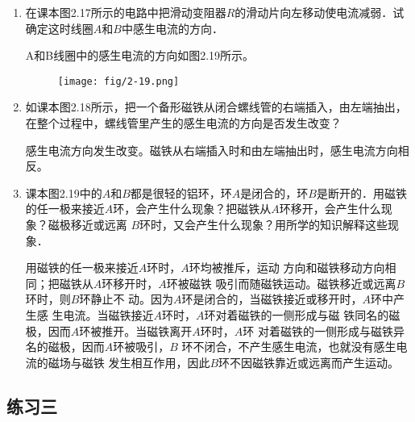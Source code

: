 \begin{enumerate}
  \item 在课本图2.17所示的电路中把滑动变阻器$R$的滑动片向左移动使电流减弱．试确定这时线圈$A$和$B$中感生电流的方向．

  \begin{solution}
    A和B线圈中的感生电流的方向如图2.19所示。
\begin{figure}[htp]\centering
\texttt{[image: fig/2-19.png]}
\caption{}
\end{figure}  
  \end{solution}
  
  \item 如课本图2.18所示，把一个备形磁铁从闭合螺线管的右端插入，由左端抽出，在整个过程中，螺线管里产生的感生电流的方向是否发生改变？

\begin{solution}
    感生电流方向发生改变。磁铁从右端插入时和由左端抽出时，感生电流方向相反。
\end{solution}



  \item 课本图2.19中的$A$和$B$都是很轻的铝环，环$A$是闭合的，环$B$是断开的．用磁铁的任一极来接近$A$环，会产生什么现象？把磁铁从$A$环移开，会产生什么现象？磁极移近或远离
  $B$环时，又会产生什么现象？用所学的知识解释这些现象．

  \begin{solution}
用磁铁的任一极来接近$A$环时，$A$环均被推斥，运动
方向和磁铁移动方向相同；把磁铁从$A$环移开时，$A$环被磁铁
吸引而随磁铁运动。磁铁移近或远离$B$环时，则$B$环静止不
动。因为$A$环是闭合的，当磁铁接近或移开时，$A$环中产生感
生电流。当磁铁接近$A$环时，$A$环对着磁铁的一侧形成与磁
铁同名的磁极，因而$A$环被推开。当磁铁离开$A$环时，$A$环
对着磁铁的一侧形成与磁铁异名的磁极，因而$A$环被吸引，$B$
环不闭合，不产生感生电流，也就没有感生电流的磁场与磁铁
发生相互作用，因此$B$环不因磁铁靠近或远离而产生运动。
\end{solution}
\end{enumerate}



\subsection{练习三}

